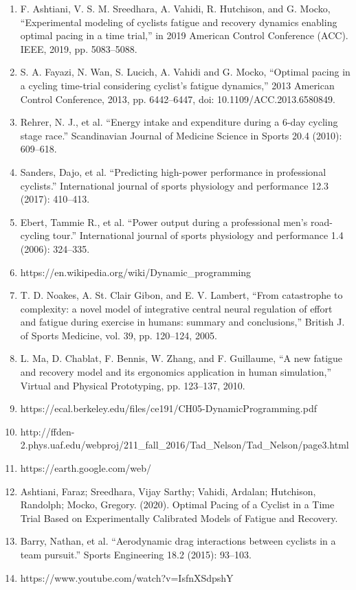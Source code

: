 \documentclass[11pt,a4paper]{ctexart}
\begin{document}
\begin{enumerate}
\item[{[1]}] F. Ashtiani, V. S. M. Sreedhara, A. Vahidi, R. Hutchison, and G. Mocko, ``Experimental modeling of cyclists fatigue and recovery dynamics enabling optimal pacing in a time trial,'' in 2019 American Control Conference (ACC). IEEE, 2019, pp. 5083--5088.
\item[{[2]}] S. A. Fayazi, N. Wan, S. Lucich, A. Vahidi and G. Mocko, ``Optimal pacing in a cycling time-trial considering cyclist's fatigue dynamics,'' 2013 American Control Conference, 2013, pp. 6442--6447, doi: 10.1109/ACC.2013.6580849.
\item[{[3]}] Rehrer, N. J., et al. ``Energy intake and expenditure during a 6-day cycling stage race.'' Scandinavian Journal of Medicine Science in Sports 20.4 (2010): 609--618.
\item[{[4]}] Sanders, Dajo, et al. ``Predicting high-power performance in professional cyclists.'' International journal of sports physiology and performance 12.3 (2017): 410--413.
\item[{[5]}] Ebert, Tammie R., et al. ``Power output during a professional men's road-cycling tour.'' International journal of sports physiology and performance 1.4 (2006): 324--335.
\item[{[6]}] https://en.wikipedia.org/wiki/Dynamic\_programming
\item[{[7]}] T. D. Noakes, A. St. Clair Gibon, and E. V. Lambert, ``From catastrophe to complexity: a novel model of integrative central neural regulation of effort and fatigue during exercise in humans: summary and conclusions,'' British J. of Sports Medicine, vol. 39, pp. 120--124, 2005.
\item[{[8]}] L. Ma, D. Chablat, F. Bennis, W. Zhang, and F. Guillaume, ``A new fatigue and recovery model and its ergonomics application in human simulation,'' Virtual and Physical Prototyping, pp. 123--137, 2010.
\item[{[9]}] https://ecal.berkeley.edu/files/ce191/CH05-DynamicProgramming.pdf
\item[{[10]}] http://ffden-2.phys.uaf.edu/webproj/211\_fall\_2016/Tad\_Nelson/Tad\_Nelson/page3.html
\item[{[11]}] https://earth.google.com/web/
\item[{[12]}] Ashtiani, Faraz; Sreedhara, Vijay Sarthy; Vahidi, Ardalan; Hutchison, Randolph; Mocko, Gregory. (2020). Optimal Pacing of a Cyclist in a Time Trial Based on Experimentally Calibrated Models of Fatigue and Recovery.
\item[{[13]}] Barry, Nathan, et al. ``Aerodynamic drag interactions between cyclists in a team pursuit.'' Sports Engineering 18.2 (2015): 93--103.
\item[{[14]}] https://www.youtube.com/watch?v=IsfnXSdpshY
\end{enumerate}
\end{document}
